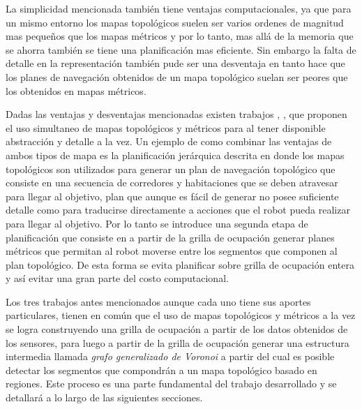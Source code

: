 La simplicidad mencionada también tiene ventajas computacionales,  ya que para un mismo entorno los mapas topológicos suelen ser varios ordenes de magnitud mas pequeños que los mapas métricos y por lo tanto, mas allá de la memoria que se ahorra también se tiene una planificación mas eficiente. Sin embargo la falta de detalle en la representación también pude ser una desventaja en tanto hace que los planes de navegación obtenidos de un mapa topológico suelan ser peores que los obtenidos en mapas métricos.

Dadas las ventajas y desventajas mencionadas existen trabajos \cite{Thrun1998}, \cite{wurm2008coordinated}, \cite{Liu2015} que proponen el uso simultaneo de mapas topológicos y métricos para  al tener disponible abstracción y detalle a la vez. Un ejemplo de como combinar las ventajas de ambos tipos de mapa es la planificación jerárquica descrita en \cite{Thrun1998} donde los mapas topológicos son utilizados para generar un plan de navegación topológico que consiste en una secuencia de corredores y habitaciones que se deben atravesar para llegar al objetivo, plan que aunque es fácil de generar no posee suficiente detalle como para traducirse directamente a acciones que el robot pueda realizar para llegar al objetivo. Por lo tanto se introduce una segunda etapa de planificación que consiste en a partir de la grilla de ocupación generar planes métricos que permitan al robot moverse entre los segmentos que componen al plan topológico. De esta forma se evita planificar sobre grilla de ocupación entera y así evitar una gran parte del costo computacional.

Los tres trabajos antes mencionados aunque cada uno tiene sus aportes particulares, tienen en común que el uso de mapas topológicos y métricos a la vez se logra construyendo una grilla de ocupación a partir de los datos obtenidos de los sensores, para luego a partir de la grilla de ocupación generar una estructura intermedia llamada \emph{grafo generalizado de Voronoi} a partir del cual es posible detectar los segmentos que compondrán a un mapa topológico basado en regiones. Este proceso es una parte fundamental del trabajo desarrollado y se detallará a lo largo de las siguientes secciones.

% 




